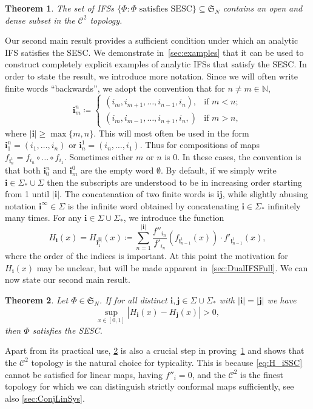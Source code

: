 \documentclass[11pt,]{article}
\def\cref#1{\ref{#1}}%
\newtheorem{theorem}{Theorem}[section]
\theoremstyle{definition}
\theoremstyle{remark}
\newcommand{\0}{\mathbf{0}}
\newcommand{\bi}{\mathbf{i}}
\newcommand{\bj}{\mathbf{j}}
\numberwithin{equation}{section}
\begin{document}
\begin{theorem}\label{thm:ESCOpenDense}
  The set of IFSs $\{\Phi \colon \Phi\text{ satisfies SESC}\}\subseteq \mathfrak{S}_N$ contains an open and
  dense subset in the $\mathcal{C}^2$ topology.
\end{theorem}
Our second main result provides a sufficient condition under which an analytic IFS satisfies the
SESC. We demonstrate in~\cref{sec:examples} that it can be used to construct completely explicit
examples of analytic IFSs that satisfy the SESC. In order to state the result, we introduce more
notation. Since we will often write finite words ``backwards'', we adopt the convention that for
$n\neq m\in\mathbb{N}$,
\begin{equation*}
	\bi_m^n\coloneqq
	\begin{cases}
		(i_m,i_{m+1},\ldots,i_{n-1},i_n), &\text{if } m<n; \\
		(i_m,i_{m-1},\ldots,i_{n+1},i_n,) &\text{if } m>n,
	\end{cases}
\end{equation*}
where $|\bi|\geq\max\{m,n\}$. This will most often be used in the form $\bi_1^n=(i_1,\ldots,i_n)$ or
$\bi_n^1=(i_n,\ldots,i_1)$. Thus for compositions of maps $f_{\bi_n^1}=f_{i_n}\circ \dots \circ
f_{i_1}$. Sometimes either $m$ or $n$ is $0$. In these cases, the convention is that both $\bi_0^n$
and $\bi_m^0$ are the empty word $\emptyset$. By default, if we simply write
$\bi\in\Sigma_*\cup\Sigma$ then the subscripts are understood to be in increasing order starting
from 1 until $|\bi|$. The concatenation of two finite words is $\bi\bj$, while slightly abusing
notation $\bi^{\infty}\in \Sigma$ is the infinite word obtained by concatenating $\bi\in\Sigma_*$
infinitely many times. 
For any $\bi\in \Sigma\cup\Sigma_*$, we introduce the function 
\begin{equation}\label{eq:H_i(x)}
H_{\bi}(x)=H_{\bi_{1}^{|\bi|}}(x) \coloneqq \sum_{n=1}^{|\bi|}
\frac{f''_{i_n}}{f'_{i_n}}(f_{\bi_{n-1}^1}(x))\cdot f'_{\bi_{n-1}^1}(x),
\end{equation}
where the order of the indices is important. At this point the motivation for $H_{\bi}(x)$ may be unclear,
but will be made apparent in~\cref{sec:DualIFSFull}. 
We can now state our second main result.
\begin{theorem}
  \label{thm:main}
  Let $\Phi\in\mathfrak{S}_N$. If for all distinct $\bi,\bj \in\Sigma\cup\Sigma_*$ with $|\bi|=|\bj|$ we have
\begin{equation}\label{eq:H_iSSC}
    \sup_{x\in[0,1]} |H_{\bi}(x) - H_{\bj}(x)| > 0,
\end{equation}
then $\Phi$ satisfies the SESC.
\end{theorem}
Apart from its practical use, \cref{thm:main} is also a crucial step in
proving~\cref{thm:ESCOpenDense} and shows that the $\mathcal{C}^2$ topology
is the natural choice for typicality.
This is because \cref{eq:H_iSSC} cannot be satisfied for linear maps, having $f''_i =0$, and the
$\mathcal{C}^2$ is the finest topology for which we can distinguish strictly conformal maps
sufficiently, see also \cref{sec:ConjLinSys}.
\end{document}
